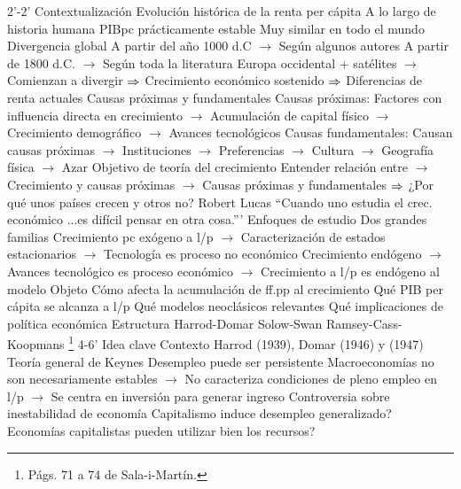 \documentclass{nuevotema}
\begin{document}
\esquemalargo

\begin{esquemal}
	\1[]  2'-2'
		\2 Contextualización
			\3 Evolución histórica de la renta per cápita
				\4 A lo largo de historia humana
				\4[] PIBpc prácticamente estable
				\4[] Muy similar en todo el mundo
				\4 Divergencia global
				\4[] A partir del año 1000 d.C
				\4[] $\to$ Según algunos autores
				\4[] A partir de 1800 d.C.
				\4[] $\to$ Según toda la literatura
				\4[] Europa occidental + satélites
				\4[] $\to$ Comienzan a divergir
				\4[] $\Rightarrow$ Crecimiento económico sostenido
				\4[] $\Rightarrow$ Diferencias de renta actuales
			\3 Causas próximas y fundamentales
				\4 Causas próximas:
				\4[] Factores con influencia directa en crecimiento
				\4[] $\to$ Acumulación de capital físico
				\4[] $\to$ Crecimiento demográfico
				\4[] $\to$ Avances tecnológicos
				\4 Causas fundamentales:
				\4[] Causan causas próximas
				\4[] $\to$ Instituciones
				\4[] $\to$ Preferencias
				\4[] $\to$ Cultura
				\4[] $\to$ Geografía física
				\4[] $\to$ Azar
				\4 Objetivo de teoría del crecimiento
				\4[] Entender relación entre
				\4[] $\to$ Crecimiento y causas próximas
				\4[] $\to$ Causas próximas y fundamentales
				\4[] $\Rightarrow$ ¿Por qué unos países crecen y otros no?
				\4 Robert Lucas
				\4[] ``Cuando uno estudia el crec. económico
				\4[] ...es difícil pensar en otra cosa.'''
			\3 Enfoques de estudio
				\4 Dos grandes familias
				\4[] Crecimiento pc exógeno a l/p
				\4[] $\to$ Caracterización de estados estacionarios
				\4[] $\to$ Tecnología es proceso no económico
				\4[] Crecimiento endógeno
				\4[] $\to$ Avances tecnológico es proceso económico
				\4[] $\to$ Crecimiento a l/p es endógeno al modelo
		\2 Objeto
			\3 Cómo afecta la acumulación de ff.pp al crecimiento
			\3 Qué PIB per cápita se alcanza a l/p
			\3 Qué modelos neoclásicos relevantes
			\3 Qué implicaciones de política económica
		\2 Estructura
			\3 Harrod-Domar
			\3 Solow-Swan
			\3 Ramsey-Cass-Koopmans
	\1 \footnote{Págs. 71 a 74 de Sala-i-Martín.} 4-6'
		\2 Idea clave
			\3 Contexto
				\4 Harrod (1939), Domar (1946) y (1947)
				\4 Teoría general de Keynes
				\4[] Desempleo puede ser persistente
				\4[] Macroeconomías no son necesariamente estables
				\4[] $\to$ No caracteriza condiciones de pleno empleo en l/p
				\4[] $\to$ Se centra en inversión para generar ingreso
				\4 Controversia sobre inestabilidad de economía
				\4[] Capitalismo induce desempleo generalizado?
				\4[] Economías capitalistas pueden utilizar bien los recursos?

\end{esquemal}
\end{document}
